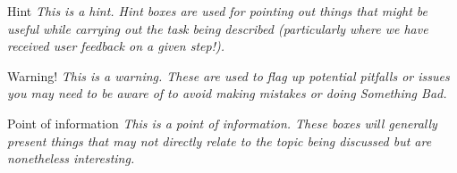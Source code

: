 \begin{hintbox}{Hint}
\emph{This is a hint. Hint boxes are used for pointing out things that might
be useful while carrying out the task being described (particularly
where we have received user feedback on a given step!).}
\end{hintbox}

\begin{warningbox}{Warning!}
\emph{This is a warning. These are used to flag up potential pitfalls or
issues you may need to be aware of to avoid making mistakes or doing
Something Bad.}
\end{warningbox}

\begin{infobox}{Point of information}
\emph{This is a point of information. These boxes will generally present
things that may not directly relate to the topic being discussed but are
nonetheless interesting.}
\end{infobox}

%
%
%
%
%
%

